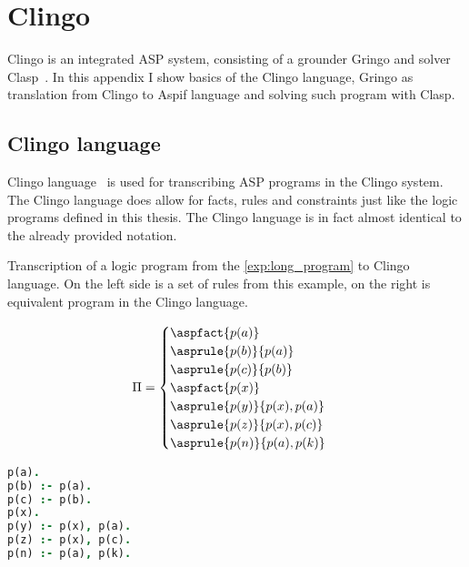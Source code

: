 \chapter{Clingo}\label{sec:clingo}

Clingo is an integrated ASP system, consisting of a grounder Gringo and solver
Clasp~\cite{aspEasy2016}.
In this appendix I show basics of the
Clingo language, Gringo as translation from Clingo to Aspif language and
solving such program with Clasp.

\section{Clingo language}\label{sec:clingo_language}
Clingo language~\cite{gebser2019potassco} is used for transcribing ASP programs
in the Clingo system.
The Clingo language does allow for facts, rules and constraints just like
the logic programs defined in this thesis. The Clingo language is in fact
almost identical to the already provided notation.

\begin{example}
    Transcription of a logic program from the \cref{exp:long_program} to Clingo language.
    On the left side is a set of rules from this example,
    on the right is equivalent program in the Clingo language.

    \begin{minipage}{.4\textwidth}
    \begin{equation*}
        \Pi =
            \begin{cases}
                \aspfact{p(a)}\\
                \asprule{p(b)}{p(a)}\\
                \asprule{p(c)}{p(b)}\\
                \aspfact{p(x)}\\
                \asprule{p(y)}{p(x), p(a)}\\
                \asprule{p(z)}{p(x), p(c)}\\
                \asprule{p(n)}{p(a), p(k)}\\
            \end{cases}
    \end{equation*}
    \end{minipage}
    \hfill
    \begin{minipage}{.4\textwidth}
        \vspace{1em}
        \begin{lstlisting}[language=Prolog, numbers=none, basicstyle=\linespread{1.25}\normalsize]
p(a).
p(b) :- p(a).
p(c) :- p(b).
p(x).
p(y) :- p(x), p(a).
p(z) :- p(x), p(c).
p(n) :- p(a), p(k).
\end{lstlisting}
    \end{minipage}
\end{example}

